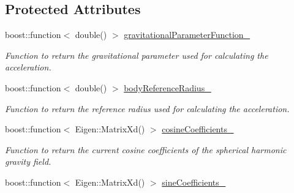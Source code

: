\subsection*{Protected Attributes}
\begin{DoxyCompactItemize}
\item 
boost\+::function$<$ double() $>$ \hyperlink{classtudat_1_1acceleration__partials_1_1SphericalHarmonicsGravityPartial_af5bbc5041a1e2e97dee7f6b47e0275c6}{gravitational\+Parameter\+Function\+\_\+}\hypertarget{classtudat_1_1acceleration__partials_1_1SphericalHarmonicsGravityPartial_af5bbc5041a1e2e97dee7f6b47e0275c6}{}\label{classtudat_1_1acceleration__partials_1_1SphericalHarmonicsGravityPartial_af5bbc5041a1e2e97dee7f6b47e0275c6}

\begin{DoxyCompactList}\small\item\em Function to return the gravitational parameter used for calculating the acceleration. \end{DoxyCompactList}\item 
boost\+::function$<$ double() $>$ \hyperlink{classtudat_1_1acceleration__partials_1_1SphericalHarmonicsGravityPartial_af13065b25666380bf551ed5d74cb3441}{body\+Reference\+Radius\+\_\+}\hypertarget{classtudat_1_1acceleration__partials_1_1SphericalHarmonicsGravityPartial_af13065b25666380bf551ed5d74cb3441}{}\label{classtudat_1_1acceleration__partials_1_1SphericalHarmonicsGravityPartial_af13065b25666380bf551ed5d74cb3441}

\begin{DoxyCompactList}\small\item\em Function to return the reference radius used for calculating the acceleration. \end{DoxyCompactList}\item 
boost\+::function$<$ Eigen\+::\+Matrix\+Xd() $>$ \hyperlink{classtudat_1_1acceleration__partials_1_1SphericalHarmonicsGravityPartial_aef82f15fb42be5c72b82010ac76747bd}{cosine\+Coefficients\+\_\+}\hypertarget{classtudat_1_1acceleration__partials_1_1SphericalHarmonicsGravityPartial_aef82f15fb42be5c72b82010ac76747bd}{}\label{classtudat_1_1acceleration__partials_1_1SphericalHarmonicsGravityPartial_aef82f15fb42be5c72b82010ac76747bd}

\begin{DoxyCompactList}\small\item\em Function to return the current cosine coefficients of the spherical harmonic gravity field. \end{DoxyCompactList}\item 
boost\+::function$<$ Eigen\+::\+Matrix\+Xd() $>$ \hyperlink{classtudat_1_1acceleration__partials_1_1SphericalHarmonicsGravityPartial_a06df326054cba1a4500e5eeccf6a1df8}{sine\+Coefficients\+\_\+}\hypertarget{classtudat_1_1acceleration__partials_1_1SphericalHarmonicsGravityPartial_a06df326054cba1a4500e5eeccf6a1df8}{}\label{classtudat_1_1acceleration__partials_1_1SphericalHarmonicsGravityPartial_a06df326054cba1a4500e5eeccf6a1df8}


\end{DoxyCompactItemize}
